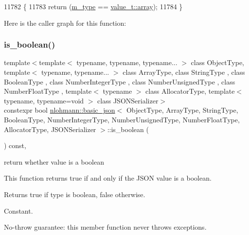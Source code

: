 \begin{DoxyCode}
11782     \{
11783         \textcolor{keywordflow}{return} (\hyperlink{classnlohmann_1_1basic__json_a91990b60d7d4d67968a2c1db677536e7}{m\_type} == \hyperlink{namespacenlohmann_1_1detail_a1ed8fc6239da25abcaf681d30ace4985af1f713c9e000f5d3f280adbd124df4f5}{value\_t::array});
11784     \}
\end{DoxyCode}
Here is the caller graph for this function\+:
\mbox{\label{classnlohmann_1_1basic__json_a943e8cb182d0f2365c76d64b42eaa6fd}} 
\subsubsection{\texorpdfstring{is\+\_\+boolean()}{is\_boolean()}}
{\footnotesize\ttfamily template$<$template$<$ typename, typename, typename... $>$ class Object\+Type, template$<$ typename, typename... $>$ class Array\+Type, class String\+Type , class Boolean\+Type , class Number\+Integer\+Type , class Number\+Unsigned\+Type , class Number\+Float\+Type , template$<$ typename $>$ class Allocator\+Type, template$<$ typename, typename=void $>$ class J\+S\+O\+N\+Serializer$>$ \\
constexpr bool \hyperlink{classnlohmann_1_1basic__json}{nlohmann\+::basic\+\_\+json}$<$ Object\+Type, Array\+Type, String\+Type, Boolean\+Type, Number\+Integer\+Type, Number\+Unsigned\+Type, Number\+Float\+Type, Allocator\+Type, J\+S\+O\+N\+Serializer $>$\+::is\+\_\+boolean (\begin{DoxyParamCaption}{ }\end{DoxyParamCaption}) const\hspace{0.3cm}{\ttfamily [inline]}, {\ttfamily [noexcept]}}



return whether value is a boolean 

This function returns true if and only if the J\+S\+ON value is a boolean.

\begin{DoxyReturn}{Returns}
{\ttfamily true} if type is boolean, {\ttfamily false} otherwise.
\end{DoxyReturn}
Constant.

No-\/throw guarantee\+: this member function never throws exceptions.

